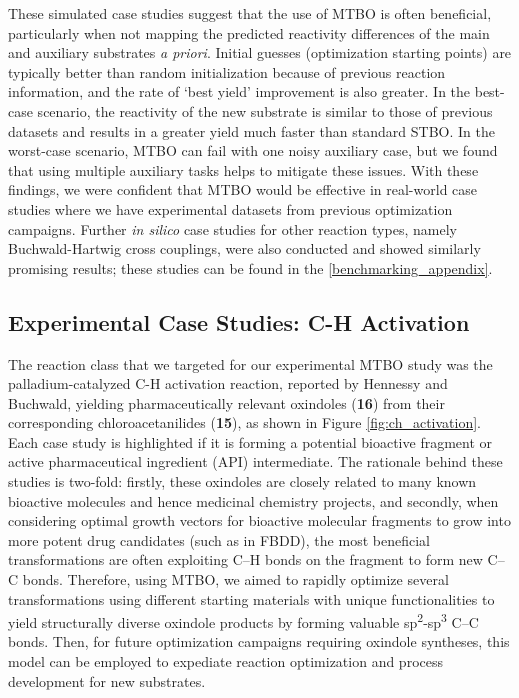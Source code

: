 These simulated case studies suggest that the use of MTBO is often beneficial, particularly when not mapping the predicted reactivity differences of the main and auxiliary substrates \textit{a priori}. Initial guesses (optimization starting points) are typically better than random initialization because of previous reaction information, and the rate of `best yield' improvement is also greater. In the best-case scenario, the reactivity of the new substrate is similar to those of previous datasets and results in a greater yield much faster than standard STBO. In the worst-case scenario, MTBO can fail with one noisy auxiliary case, but we found that using multiple auxiliary tasks helps to mitigate these issues.  With these findings, we were confident that MTBO would be effective in real-world case studies where we have experimental datasets from previous optimization campaigns. Further \textit{in silico} case studies for other reaction types, namely Buchwald-Hartwig cross couplings, were also conducted and showed similarly promising results; these studies can be found in the \ref{benchmarking_appendix}.

\subsection{Experimental Case Studies: C-H Activation}

The reaction class that we targeted for our experimental MTBO study was the palladium-catalyzed C-H activation reaction, reported by Hennessy and Buchwald, yielding pharmaceutically relevant oxindoles (\textbf{16}) from their corresponding chloroacetanilides (\textbf{15}), as shown in Figure \ref{fig:ch_activation}. Each case study is highlighted if it is forming a potential bioactive fragment or active pharmaceutical ingredient (API) intermediate. The rationale behind these studies is two-fold: firstly, these oxindoles are closely related to many known bioactive molecules and hence medicinal chemistry projects, and secondly, when considering optimal growth vectors for bioactive molecular fragments to grow into more potent drug candidates (such as in FBDD), the most beneficial transformations are often exploiting C--H bonds on the fragment to form new C--C bonds. Therefore, using MTBO, we aimed to rapidly optimize several transformations using different starting materials with unique functionalities to yield structurally diverse oxindole products by forming valuable sp\textsuperscript{2}-sp\textsuperscript{3} C--C bonds. Then, for future optimization campaigns requiring oxindole syntheses, this model can be employed to expediate reaction optimization and process development for new substrates.

